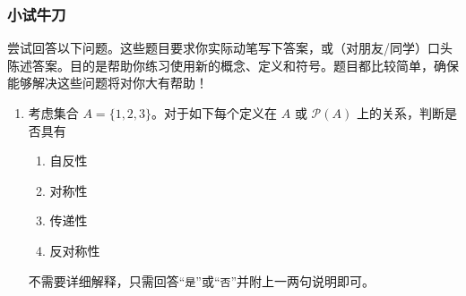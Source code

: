 \subsubsection*{小试牛刀}

尝试回答以下问题。这些题目要求你实际动笔写下答案，或（对朋友/同学）口头陈述答案。目的是帮助你练习使用新的概念、定义和符号。题目都比较简单，确保能够解决这些问题将对你大有帮助！

\begin{enumerate}[label=(\arabic*)]
    \item 考虑集合 $A = \{1, 2, 3\}$。对于如下每个定义在 $A$ 或 $\mathcal{P}(A)$ 上的关系，判断是否具有
    \begin{enumerate}[i]
        \item 自反性
        \item 对称性
        \item 传递性
        \item 反对称性
    \end{enumerate}

    不需要详细解释，只需回答``\verb|是|''或``\verb|否|''并附上一两句说明即可。


\end{enumerate}
